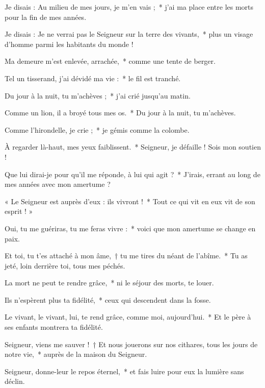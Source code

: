 \item Je disais : Au milieu de mes jours, je m’en vais ;~* j’ai ma place entre les morts pour la fin de mes années.

\item Je disais : Je ne verrai pas le Seigneur sur la terre des vivants,~* plus un visage d’homme parmi les habitants du monde !

\item Ma demeure m’est enlevée, arrachée,~* comme une tente de berger.

\item Tel un tisserand, j’ai dévidé ma vie :~* le fil est tranché.

\item Du jour à la nuit, tu m’achèves ;~* j’ai crié jusqu’au matin.

\item Comme un lion, il a broyé tous mes os.~* Du jour à la nuit, tu m’achèves. 

\item Comme l’hirondelle, je crie ;~* je gémis comme la colombe.

\item À regarder là-haut, mes yeux faiblissent.~* Seigneur, je défaille ! Sois mon soutien !

\item Que lui dirai-je pour qu’il me réponde, à lui qui agit ?~* J’irais, errant au long de mes années avec mon amertume ?

\item « Le Seigneur est auprès d’eux : ils vivront !~* Tout ce qui vit en eux vit de son esprit ! »

\item Oui, tu me guériras, tu me feras vivre :~* voici que mon amertume se change en paix.

\item Et toi, tu t’es attaché à mon âme,~† tu me tires du néant de l’abîme.~* Tu as jeté, loin derrière toi, tous mes péchés.

\item La mort ne peut te rendre grâce,~* ni le séjour des morts, te louer.

\item Ils n’espèrent plus ta fidélité,~* ceux qui descendent dans la fosse.

\item Le vivant, le vivant, lui, te rend grâce, comme moi, aujourd’hui.~* Et le père à ses enfants montrera ta fidélité.

\item Seigneur, viens me sauver !~† Et nous jouerons sur nos cithares, tous les jours de notre vie,~* auprès de la maison du Seigneur.

\item Seigneur, donne-leur le repos éternel,~* et fais luire pour eux la lumière sans déclin.